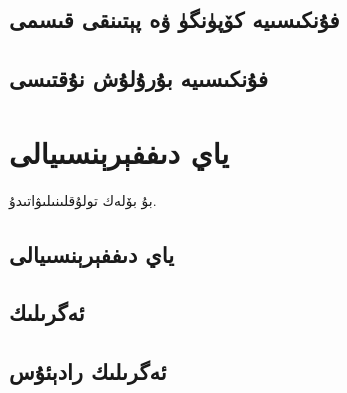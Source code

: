 \subsection{فۇنكىسىيە كۆپۈنگۈ ۋە پېتىنقى قىسمى}
\subsection{فۇنكىسىيە بۇرۇلۇش نۇقتىسى}

\section{ياي دىففېرېنسىيالى}
بۇ بۆلەك تولۇقلىنىلىۋاتىدۇ.
\subsection{ياي دىففېرېنسىيالى}
\subsection{ئەگرىلىك}
\subsection{ئەگرىلىك رادېئۇس}
